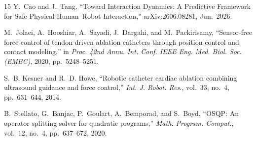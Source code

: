 \begin{thebibliography}{15}
Y.~Cao and J.~Tang, ``Toward Interaction Dynamics: A Predictive Framework for Safe Physical Human--Robot Interaction,'' arXiv:2606.08281, Jun.\ 2026.

M.~Jolaei, A.~Hooshiar, A.~Sayadi, J.~Dargahi, and M.~Packirisamy, ``Sensor-free force control of tendon-driven ablation catheters through position control and contact modeling,'' in \emph{Proc. 42nd Annu. Int. Conf. IEEE Eng. Med. Biol. Soc. (EMBC)}, 2020, pp.~5248--5251.

S.~B. Kesner and R.~D. Howe, ``Robotic catheter cardiac ablation combining ultrasound guidance and force control,'' \emph{Int. J. Robot. Res.}, vol.~33, no.~4, pp.~631--644, 2014.

B.~Stellato, G.~Banjac, P.~Goulart, A.~Bemporad, and S.~Boyd, ``OSQP: An operator splitting solver for quadratic programs,'' \emph{Math. Program. Comput.}, vol.~12, no.~4, pp.~637--672, 2020.

\end{thebibliography}

